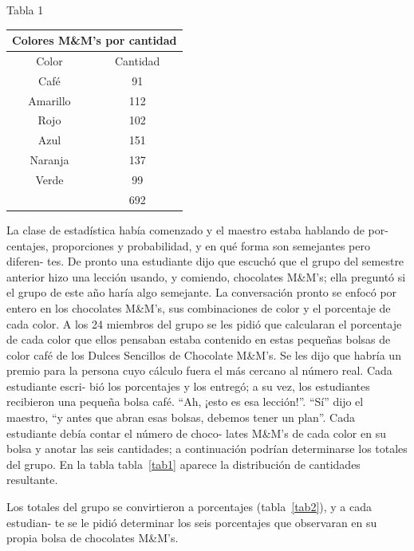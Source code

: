 \documentclass[10pt,twoside]{article}
\begin{document}
\begin{minipage}{0.35\textwidth}
\begin{center}
Tabla 1
\end{center}
\begin{tabular}{c|c}\label{tabla 1}
\multicolumn{2}{c}{Colores M\&M's por cantidad} \\ \hline
Color & Cantidad \\ \hline
Café & 91 \\ 
Amarillo & 112 \\ 
Rojo & 102 \\ 
Azul & 151 \\ 
Naranja & 137 \\ 
Verde & 99 \\ \cline{2-2}
 & 692 \\ 
\hline 
\end{tabular}
\end{minipage}\hfill
\begin{minipage}{.6\textwidth}
La clase de estadística había comenzado y el maestro estaba hablando de por-
centajes, proporciones y probabilidad, y en qué forma son semejantes pero diferen-
tes. De pronto una estudiante dijo que escuchó que el grupo del semestre anterior
hizo una lección usando, y comiendo, chocolates M\&M’s; ella preguntó si el grupo
de este año haría algo semejante. La conversación pronto se enfocó por entero en
los chocolates M\&M’s, sus combinaciones de color y el porcentaje de cada color. A
los 24 miembros del grupo se les pidió que calcularan el porcentaje de cada color
que ellos pensaban estaba contenido en estas pequeñas bolsas de color café de los
Dulces Sencillos de Chocolate M\&M’s. Se les dijo que habría un premio para la
persona cuyo cálculo fuera el más cercano al número real. Cada estudiante escri-
bió los porcentajes y los entregó; a su vez, los estudiantes recibieron una pequeña
bolsa café. “Ah, ¡esto es esa lección!”. “Sí” dijo el maestro, “y antes que abran esas
bolsas, debemos tener un plan”. Cada estudiante debía contar el número de choco-
lates M\&M's de cada color en su bolsa y anotar las seis cantidades; a continuación
podrían determinarse los totales del grupo. En la tabla tabla~\ref{tab1} aparece la distribución
de cantidades resultante.
\end{minipage} 

Los totales del grupo se convirtieron a porcentajes (tabla~\ref{tab2}), y a cada estudian-
te se le pidió determinar los seis porcentajes que observaran en su propia bolsa de
chocolates M\&M's.
\end{document}
